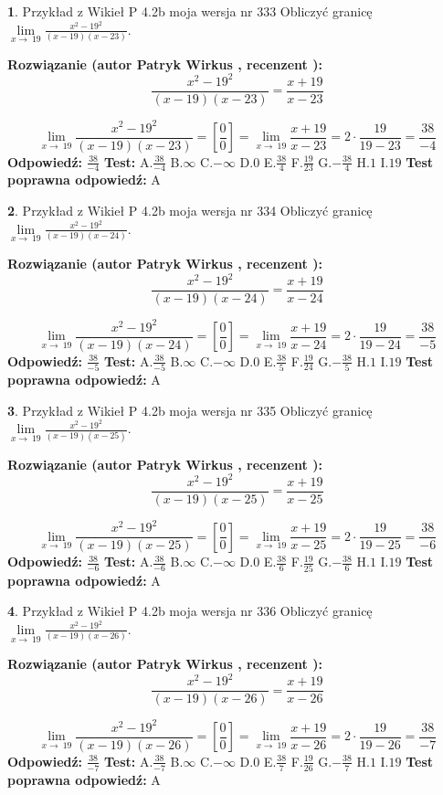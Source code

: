 \documentclass[12pt, a4paper]{article}
\theoremstyle{definition} %
\newtheorem{zad}{}
\newcommand{\zadStart}[1]{\begin{zad}#1\newline}
\newcommand{\zadStop}{\end{zad}}
\newcommand{\rozwStart}[2]{\noindent \textbf{Rozwiązanie (autor #1 , recenzent #2): }\newline}
\newcommand{\rozwStop}{\newline}
\newcommand{\odpStart}{\noindent \textbf{Odpowiedź:}\newline}
\newcommand{\odpStop}{\newline}
\newcommand{\testStart}{\noindent \textbf{Test:}\newline}
\newcommand{\testStop}{\newline}
\newcommand{\kluczStart}{\noindent \textbf{Test poprawna odpowiedź:}\newline}
\newcommand{\kluczStop}{\newline}
\begin{document}
\zadStart{Przykład z Wikieł P 4.2b moja wersja nr 333}
Obliczyć granicę $\lim\limits_{x\to\ 19}\frac{x^{2}-19^{2}}{(x-19)(x-23)}$.
\zadStop
\rozwStart{Patryk Wirkus}{}
$$\frac{x^{2}-19^{2}}{(x-19)(x-23)}=\frac{x+19}{x-23}$$

$$\lim\limits_{x\to\ 19}\frac{x^{2}-19^{2}}{(x-19)(x-23)}=[\frac{0}{0}]=\lim\limits_{x\to\ 19}\frac{x+19}{x-23}=2 \cdot \frac{19}{19-23} = \frac{38}{-4}$$
\rozwStop
\odpStart
$\frac{38}{-4}$
\odpStop
\testStart
A.$\frac{38}{-4}$
B.$\infty$
C.$-\infty$
D.$0$
E.$\frac{38}{4}$
F.$\frac{19}{23}$
G.$-\frac{38}{4}$
H.$1$
I.$19$
\testStop
\kluczStart
A
\kluczStop



\zadStart{Przykład z Wikieł P 4.2b moja wersja nr 334}
Obliczyć granicę $\lim\limits_{x\to\ 19}\frac{x^{2}-19^{2}}{(x-19)(x-24)}$.
\zadStop
\rozwStart{Patryk Wirkus}{}
$$\frac{x^{2}-19^{2}}{(x-19)(x-24)}=\frac{x+19}{x-24}$$

$$\lim\limits_{x\to\ 19}\frac{x^{2}-19^{2}}{(x-19)(x-24)}=[\frac{0}{0}]=\lim\limits_{x\to\ 19}\frac{x+19}{x-24}=2 \cdot \frac{19}{19-24} = \frac{38}{-5}$$
\rozwStop
\odpStart
$\frac{38}{-5}$
\odpStop
\testStart
A.$\frac{38}{-5}$
B.$\infty$
C.$-\infty$
D.$0$
E.$\frac{38}{5}$
F.$\frac{19}{24}$
G.$-\frac{38}{5}$
H.$1$
I.$19$
\testStop
\kluczStart
A
\kluczStop



\zadStart{Przykład z Wikieł P 4.2b moja wersja nr 335}
Obliczyć granicę $\lim\limits_{x\to\ 19}\frac{x^{2}-19^{2}}{(x-19)(x-25)}$.
\zadStop
\rozwStart{Patryk Wirkus}{}
$$\frac{x^{2}-19^{2}}{(x-19)(x-25)}=\frac{x+19}{x-25}$$

$$\lim\limits_{x\to\ 19}\frac{x^{2}-19^{2}}{(x-19)(x-25)}=[\frac{0}{0}]=\lim\limits_{x\to\ 19}\frac{x+19}{x-25}=2 \cdot \frac{19}{19-25} = \frac{38}{-6}$$
\rozwStop
\odpStart
$\frac{38}{-6}$
\odpStop
\testStart
A.$\frac{38}{-6}$
B.$\infty$
C.$-\infty$
D.$0$
E.$\frac{38}{6}$
F.$\frac{19}{25}$
G.$-\frac{38}{6}$
H.$1$
I.$19$
\testStop
\kluczStart
A
\kluczStop



\zadStart{Przykład z Wikieł P 4.2b moja wersja nr 336}
Obliczyć granicę $\lim\limits_{x\to\ 19}\frac{x^{2}-19^{2}}{(x-19)(x-26)}$.
\zadStop
\rozwStart{Patryk Wirkus}{}
$$\frac{x^{2}-19^{2}}{(x-19)(x-26)}=\frac{x+19}{x-26}$$

$$\lim\limits_{x\to\ 19}\frac{x^{2}-19^{2}}{(x-19)(x-26)}=[\frac{0}{0}]=\lim\limits_{x\to\ 19}\frac{x+19}{x-26}=2 \cdot \frac{19}{19-26} = \frac{38}{-7}$$
\rozwStop
\odpStart
$\frac{38}{-7}$
\odpStop
\testStart
A.$\frac{38}{-7}$
B.$\infty$
C.$-\infty$
D.$0$
E.$\frac{38}{7}$
F.$\frac{19}{26}$
G.$-\frac{38}{7}$
H.$1$
I.$19$
\testStop
\kluczStart
A
\kluczStop
\end{document}
